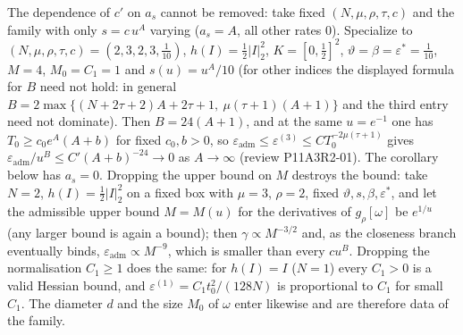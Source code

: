 \begin{remark}\label{bpP:p11a:adm-budget-necessary}
The dependence of $c'$ on $a_s$ cannot be removed: take fixed $(N,\mu,\rho,\tau,c)$ and the family with only $s=c\,u^{A}$ varying ($a_s=A$, all other rates $0$). Specialize to $(N,\mu,\rho,\tau,c)=(2,3,2,3,\frac1{10})$, $h(I)=\frac12\lvert I\rvert_2^2$, $K=[0,\frac12]^2$, $\vartheta=\beta=\varepsilon^*=\frac1{10}$, $M=4$, $M_0=C_1=1$ and $s(u)=u^A/10$ (for other indices the displayed formula for $B$ need not hold: in general $B=2\max\{(N+2\tau+2)A+2\tau+1,\ \mu(\tau+1)(A+1)\}$ and the third entry need not dominate). Then $B=24(A+1)$, and at the same $u=e^{-1}$ one has $T_0\ge c_0e^{A}(A+b)$ for fixed $c_0,b>0$, so $\varepsilon_{\mathrm{adm}}\le\varepsilon^{(3)}\le CT_0^{-2\mu(\tau+1)}$ gives $\varepsilon_{\mathrm{adm}}/u^{B}\le C'(A+b)^{-24}\to0$ as $A\to\infty$ (review P11A3R2-01). The corollary below has $a_s=0$. Dropping the upper bound on $M$ destroys the bound: take $N=2$, $h(I)=\frac12\lvert I\rvert_2^2$ on a fixed box with $\mu=3$, $\rho=2$, fixed $\vartheta,s,\beta,\varepsilon^*$, and let the admissible upper bound $M=M(u)$ for the derivatives of $g_\rho[\omega]$ be $e^{1/u}$ (any larger bound is again a bound); then $\gamma\propto M^{-3/2}$ and, as the closeness branch eventually binds, $\varepsilon_{\mathrm{adm}}\propto M^{-9}$, which is smaller than every $cu^{B}$. Dropping the normalisation $C_1\ge1$ does the same: for $h(I)=I$ ($N=1$) every $C_1>0$ is a valid Hessian bound, and $\varepsilon^{(1)}=C_1t_0^2/(128N)$ is proportional to $C_1$ for small $C_1$. The diameter $d$ and the size $M_0$ of $\omega$ enter likewise and are therefore data of the family.
\end{remark}

